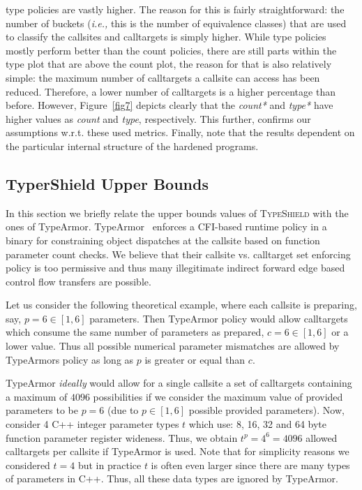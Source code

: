 type policies are vastly higher. The reason for this is fairly straightforward: the number 
of buckets (\textit{i.e.,} this is the number of equivalence classes)
that are used to classify the callsites and calltargets is simply higher. While type policies mostly 
perform better than the count policies, there are still parts within the type plot that are above the 
count plot, the reason for that is also relatively simple: the maximum number of calltargets a 
callsite can access has been reduced. Therefore, a lower number of calltargets is a higher 
percentage than before. However, Figure~\ref{fig7} depicts clearly
that the \textit{count*} and \textit{type*} have higher values as 
\textit{count} and \textit{type}, respectively. This further, confirms our assumptions 
w.r.t. these used metrics. Finally, note that the results dependent on the particular 
internal structure of the hardened programs.


\subsection{TyperShield Upper Bounds}
\label{RQ6:TyperArmor's Imprecise Parameter-Count Policy}
\label{Too Permissive Parameter-Based Policies}
In this section we briefly relate the upper bounds values of \textsc{TypeShield} with the ones of TypeArmor.
TypeArmor~\cite{veen:typearmor} enforces a CFI-based runtime policy in a binary for constraining object dispatches at the callsite based on
function parameter count checks.
We believe that their callsite vs. calltarget set enforcing policy is too permissive and thus
many illegitimate indirect forward edge based control flow transfers are possible. 

Let us consider the following theoretical example, where each callsite is
preparing, say, $p=6 \in [1, 6]$ parameters. Then TypeArmor policy would allow calltargets which consume the same number of parameters as
prepared, $c=6 \in [1, 6]$ or a lower value. Thus all possible numerical parameter mismatches are allowed by TypeArmors policy as long
as $p$ is greater or equal than $c$.

TypeArmor {\textit{ideally}} would allow for a single callsite a set of calltargets containing a maximum of $4096$ possibilities if we 
consider the maximum value of provided parameters to be $p=6$ (due to $p \in [1, 6]$ possible provided parameters). Now, consider 4 C++ integer parameter
types $t$ which use: 8, 16, 32 and 64 byte function parameter register wideness. Thus, we obtain $t^{p}=4^{6}=4096$ allowed calltargets per 
callsite if TypeArmor is used. Note that for simplicity reasons we considered $t=4$ but in practice $t$ is often even larger since there are many types
of parameters in C++. Thus, all these data types are ignored by TypeArmor.

